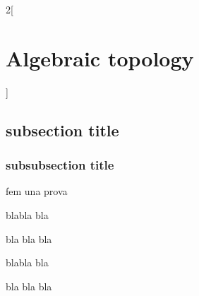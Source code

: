 \documentclass[../../../main.tex]{subfiles}
\begin{document}
\renewcommand{\col}{\geo}
\begin{multicols}{2}[\section{Algebraic topology}]
  \subsection{subsection title}
  \subsubsection{subsubsection title}
  \begin{definition}
    fem una prova
  \end{definition}
  \begin{theorem}
    blabla bla
  \end{theorem}
  \begin{lemma}
    bla bla bla
  \end{lemma}
  \begin{proposition}
    blabla bla
  \end{proposition}
  \begin{corollary}
    bla bla bla
  \end{corollary}
\end{multicols}
\end{document}
